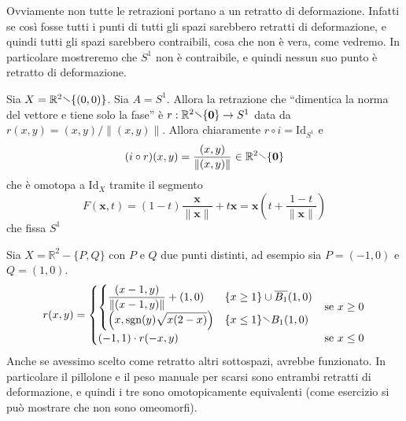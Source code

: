 Ovviamente non tutte le retrazioni portano a un retratto di deformazione.
Infatti se così fosse tutti i punti di tutti gli spazi sarebbero retratti di
deformazione, e quindi tutti gli spazi sarebbero contraibili, cosa che non è
vera, come vedremo. In particolare mostreremo che \(S^{1}\) non è contraibile, e
quindi nessun suo punto è retratto di deformazione. 

\begin{example}
    Sia \(X = \mathbb{R}^2 \sminus \{{(0,0)}\} \). Sia \(A = S^{1}\). Allora la
    retrazione che ``dimentica la norma del vettore e tiene solo la fase'' è \(r
    : \mathbb{R}^2 \sminus \{\mathbf{0} \} \to S^{1}\) data da \(r{(x, y)} = {(x,y)} /
    \|{(x,y)}\|\). Allora chiaramente \(r \circ i = \mathrm{Id}_{S^{1}} \)  e
    \[
        (i \circ r){(x, y)} = \frac{(x,y)}{\|{(x,y)}\|} \in \mathbb{R}^2 \sminus
        \{\mathbf{0} \} 
    \]
    che è omotopa a \(\mathrm{Id}_X\) tramite il segmento
    \[
      F{(\mathbf{x} ,t)} = {(1-t)}\frac{\mathbf{x} }{\|\mathbf{x} \|} +
      t\mathbf{x}  = {\mathbf{x} }{\left(
      {t + \frac{1-t}{\|\mathbf{x} \|}}\right)} 
    \]
    che fissa \(S^{1}\) 
\end{example}


\begin{example}
    Sia \(X = \mathbb{R}^2 - \{P, Q\} \) con \(P\) e \(Q\) due punti distinti,
    ad esempio sia \(P = {(-1, 0)}\) e \(Q = {(1, 0)}\).
    \[
      r{(x,y)} = \begin{cases}
      \begin{cases}
          \displaystyle{\frac{(x-1, y)}{\|{(x-1, y)}\|} + {(1,0)}} & \{x \ge 1\} \cup
          \overline{B_{1}}{(1,0)} \\
          \displaystyle\left(x, \mathrm{sgn} {(y)} \sqrt{x{(2-x)}}\right) & \{x \le 1\} \sminus
          B_{1}{(1,0)} \\
      \end{cases}
       & \text{se }x \ge 0 \\
          {(-1, 1)} \cdot  r{(-x, y)} & \text{se }x \le 0
      \end{cases}
  \]
  Anche se avessimo scelto come retratto altri sottospazi, avrebbe funzionato.
  In particolare il pillolone e il peso manuale per scarsi sono entrambi
  retratti di deformazione, e quindi i tre sono omotopicamente equivalenti (come
  esercizio si può mostrare che non sono omeomorfi).
\end{example}

